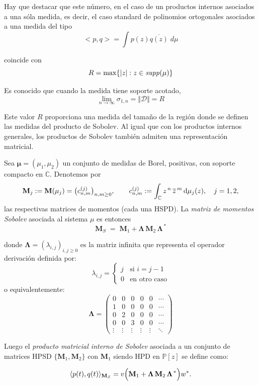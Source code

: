 \noindent Hay que destacar que este número, en el caso de un productos internos asociados a una sóla medida, es decir, el caso standard de polinomios ortogonales asociados a una medida del tipo
$$
  <p,q>=\int p(z) \overline{q(z)} \; d\mu
$$

\noindent
coincide con
$$
  R=\max \{ \vert z \vert : z\in {\it supp}(\mu)\}
$$

\noindent Es conocido que cuando la medida tiene soporte acotado,
$$\lim_{n\to \infty} \sigma_{1,n} = \Vert \mathcal{D}\Vert = R$$


Este valor $R$ proporciona una medida del tamaño de la región donde se definen las medidas del producto de Sobolev. Al igual que con los productos internos generales, los productos de Sobolev también admiten una representación matricial.

\begin{definition}\label{def:sobolev_matrix}
  \cite{escribano2025boundedness}
  Sea $\boldsymbol{\mu}=(\mu_{1},\mu_{2})$ un conjunto de medidas de Borel,
  positivas, con soporte compacto en $\mathbb{C}$.
  Denotemos por
  \[
    \textbf{M}_j:=\textbf{M}(\mu_j)=\bigl(c^{(j)}_{n,m}\bigr)_{n,m\ge0},
    \qquad
    c^{(j)}_{n,m}:=\int_{\mathbb C} z^{\,n}\,\overline{z}^{\,m}\,{\rm d}\mu_j(z),
    \quad j=1,2,
  \]
  las respectivas matrices de momentos (cada una HSPD).
  \vspace{0.4em}
  La \emph{matriz de momentos Sobolev}
  asociada al sistema \(\mu\) es entonces
  \[
    \textbf{M}_S \;=\;
    \textbf{M}_1 + \boldsymbol{\Lambda}\,\textbf{M}_2\,
    \boldsymbol{\Lambda}^{\,*}
  \]

  donde $\boldsymbol{\Lambda} = (\lambda_{i,j})_{i,j\ge0}$ es la matriz infinita que representa el operador derivación definida por:
  \[
    \lambda_{i,j} = \begin{cases}
      j & \text{si } i = j-1  \\
      0 & \text{en otro caso}
    \end{cases}
  \]
  o equivalentemente:
  \[
    \boldsymbol{\Lambda} = \begin{pmatrix}
      0      & 0      & 0      & 0      & 0      & \cdots \\
      1      & 0      & 0      & 0      & 0      & \cdots \\
      0      & 2      & 0      & 0      & 0      & \cdots \\
      0      & 0      & 3      & 0      & 0      & \cdots \\
      \vdots & \vdots & \vdots & \vdots & \vdots & \ddots
    \end{pmatrix}
  \]

  Luego el \emph{producto matricial interno de Sobolev} asociada a un conjunto de matrices HPSD \(\{\textbf{M}_1,\textbf{M}_2\}\) con $\textbf{M}_1$ siendo HPD en $\mathbb{P}[z]$ se define como:

  $$
    \langle p(t), q(t) \rangle_{\textbf{M}_{S}} = v \Bigl( \textbf{M}_1 + \boldsymbol{\Lambda}\,\textbf{M}_2\,
    \boldsymbol{\Lambda}^{\,*}\Bigr) w^{*}.
  $$
\end{definition}

